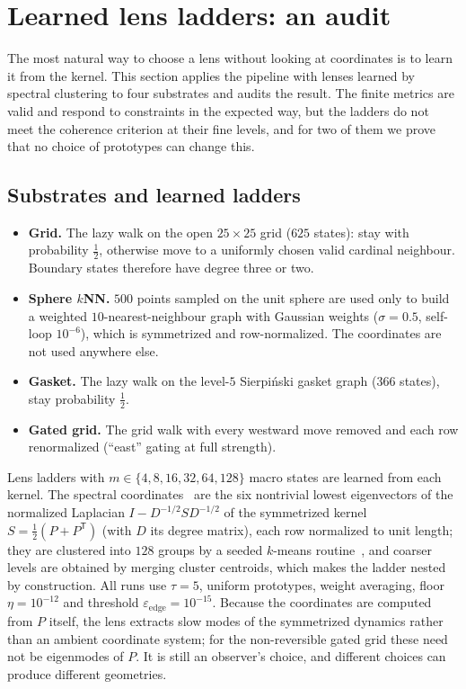 \documentclass[11pt]{article}
\begin{document}
 \section{Learned lens ladders: an audit}
\label{sec:learned}

The most natural way to choose a lens without looking at coordinates is to learn it from the kernel.
This section applies the pipeline with lenses learned by spectral clustering to four substrates and audits the result.
The finite metrics are valid and respond to constraints in the expected way, but the ladders do not meet the coherence criterion at their fine levels, and for two of them we prove that no choice of prototypes can change this.

\subsection{Substrates and learned ladders}
\label{sec:substrates}

\begin{itemize}[leftmargin=*]
\item \textbf{Grid.} The lazy walk on the open $25\times25$ grid ($625$ states): stay with probability $\tfrac12$, otherwise move to a uniformly chosen valid cardinal neighbour. Boundary states therefore have degree three or two.
\item \textbf{Sphere $k$NN.} $500$ points sampled on the unit sphere are used only to build a weighted $10$-nearest-neighbour graph with Gaussian weights ($\sigma=0.5$, self-loop $10^{-6}$), which is symmetrized and row-normalized. The coordinates are not used anywhere else.
\item \textbf{Gasket.} The lazy walk on the level-$5$ Sierpi\'nski gasket graph ($366$ states), stay probability $\tfrac12$.
\item \textbf{Gated grid.} The grid walk with every westward move removed and each row renormalized (``east'' gating at full strength).
\end{itemize}
Lens ladders with $m\in\{4,8,16,32,64,128\}$ macro states are learned from each kernel.
The spectral coordinates~\cite{CoifmanLafon2006,vonLuxburg2007} are the six nontrivial lowest eigenvectors of the normalized Laplacian $I-D^{-1/2}SD^{-1/2}$ of the symmetrized kernel $S=\tfrac12(P+P^{\mathsf T})$ (with $D$ its degree matrix), each row normalized to unit length; they are clustered into $128$ groups by a seeded $k$-means routine~\cite{Lloyd1982}, and coarser levels are obtained by merging cluster centroids, which makes the ladder nested by construction.
All runs use $\tau=5$, uniform prototypes, weight averaging, floor $\eta=10^{-12}$ and threshold $\varepsilon_{\mathrm{edge}}=10^{-15}$.
Because the coordinates are computed from $P$ itself, the lens extracts slow modes of the symmetrized dynamics rather than an ambient coordinate system; for the non-reversible gated grid these need not be eigenmodes of $P$.
It is still an observer's choice, and different choices can produce different geometries.
\end{document}
